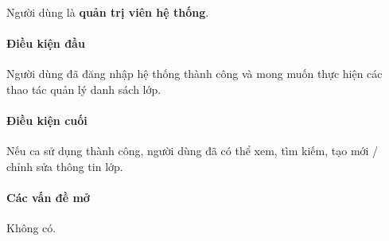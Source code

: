 \documentclass[./../main.tex]{subfiles}
\begin{document}
Người dùng là \textbf{quản trị viên hệ thống}.

\paragraph*{Điều kiện đầu}

Người dùng đã đăng nhập hệ thống thành công và mong muốn thực hiện các thao tác quản lý danh sách lớp.

\paragraph*{Điều kiện cuối}

Nếu ca sử dụng thành công, người dùng đã có thể xem, tìm kiếm, tạo mới / chỉnh sửa thông tin lớp.

\paragraph*{Các vấn đề mở}

Không có.
\end{document}
